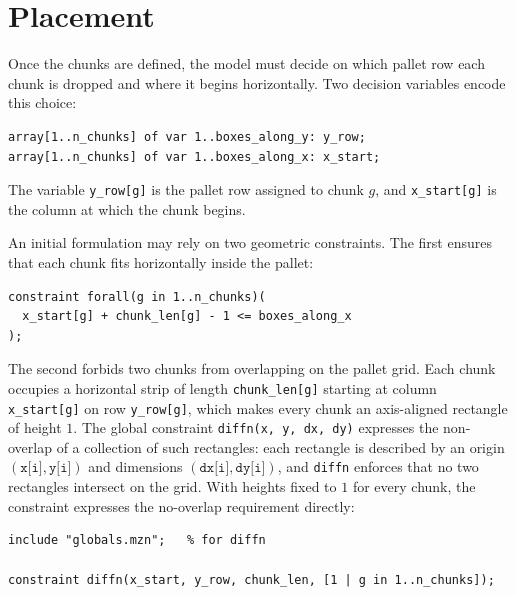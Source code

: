 \section{Placement}
\label{sec:placement}

Once the chunks are defined, the model must decide on which pallet row each
chunk is dropped and where it begins horizontally. Two decision variables
encode this choice:

\vspace{0.5cm}
\begin{lstlisting}
array[1..n_chunks] of var 1..boxes_along_y: y_row;
array[1..n_chunks] of var 1..boxes_along_x: x_start;
\end{lstlisting}
\vspace{0.5cm}

The variable \texttt{y\_row[g]} is the pallet row assigned to chunk \(g\),
and \texttt{x\_start[g]} is the column at which the chunk begins.

An initial formulation may rely on two geometric constraints. The first
ensures that each chunk fits horizontally inside the pallet:

\vspace{0.5cm}
\begin{lstlisting}
constraint forall(g in 1..n_chunks)(
  x_start[g] + chunk_len[g] - 1 <= boxes_along_x
);
\end{lstlisting}
\vspace{0.5cm}

The second forbids two chunks from overlapping on the pallet grid. Each
chunk occupies a horizontal strip of length \texttt{chunk\_len[g]} starting
at column \texttt{x\_start[g]} on row \texttt{y\_row[g]}, which makes every
chunk an axis-aligned rectangle of height \(1\). The global constraint
\texttt{diffn(x, y, dx, dy)} expresses the non-overlap of a collection of
such rectangles: each rectangle is described by an origin
\((\texttt{x[i]}, \texttt{y[i]})\) and dimensions
\((\texttt{dx[i]}, \texttt{dy[i]})\), and \texttt{diffn} enforces that no
two rectangles intersect on the grid. With heights fixed to \(1\) for every
chunk, the constraint expresses the no-overlap requirement directly:

\vspace{0.5cm}
\begin{lstlisting}
include "globals.mzn";   % for diffn

constraint diffn(x_start, y_row, chunk_len, [1 | g in 1..n_chunks]);
\end{lstlisting}
\vspace{0.5cm}

